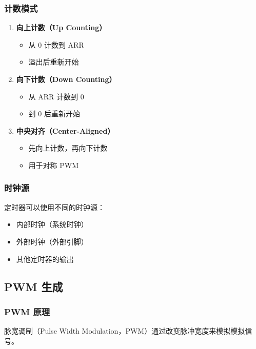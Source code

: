 \subsubsection{计数模式}

\begin{enumerate}
  \item \textbf{向上计数（Up Counting）}
    \begin{itemize}
      \item 从 0 计数到 ARR
      \item 溢出后重新开始
    \end{itemize}

  \item \textbf{向下计数（Down Counting）}
    \begin{itemize}
      \item 从 ARR 计数到 0
      \item 到 0 后重新开始
    \end{itemize}

  \item \textbf{中央对齐（Center-Aligned）}
    \begin{itemize}
      \item 先向上计数，再向下计数
      \item 用于对称 PWM
    \end{itemize}
\end{enumerate}

\subsubsection{时钟源}

定时器可以使用不同的时钟源：
\begin{itemize}
  \item 内部时钟（系统时钟）
  \item 外部时钟（外部引脚）
  \item 其他定时器的输出
\end{itemize}

\subsection{PWM 生成}

\subsubsection{PWM 原理}

脉宽调制（Pulse Width Modulation，PWM）通过改变脉冲宽度来模拟模拟信号。

